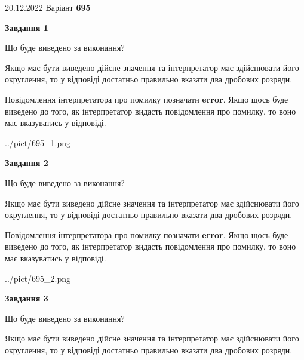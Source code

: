 \documentclass[12pt, ukrainian]{article}
\begin{document}
{20.12.2022 Варіант \No \textbf { 695 }\par}
{
\begin {Large}

{\begin {center}\textbf{Завдання 1}\end {center}}\par
Що буде виведено за виконання? \par

Якщо має бути виведено дійсне значення та інтерпретатор має здійснювати його округлення, 
то у відповіді достатньо правильно вказати два дробових розряди.

Повідомлення інтерпретатора про помилку позначати \textbf{error}.
Якщо щось буде виведено до того, як інтерпретатор видасть повідомлення про помилку, 
то воно має вказуватись у відповіді. \par

\begin{center}
	{../pict/695_1.png}
\end{center}
\newpage

{\begin {center}\textbf{Завдання 2}\end {center}}\par
Що буде виведено за виконання? \par

Якщо має бути виведено дійсне значення та інтерпретатор має здійснювати його округлення, 
то у відповіді достатньо правильно вказати два дробових розряди.

Повідомлення інтерпретатора про помилку позначати \textbf{error}.
Якщо щось буде виведено до того, як інтерпретатор видасть повідомлення про помилку, 
то воно має вказуватись у відповіді. \par

\begin{center}
	{../pict/695_2.png}
\end{center}
\newpage

{\begin {center}\textbf{Завдання 3}\end {center}}\par
Що буде виведено за виконання? \par

Якщо має бути виведено дійсне значення та інтерпретатор має здійснювати його округлення, 
то у відповіді достатньо правильно вказати два дробових розряди.


\end{Large}}
\end{document}
